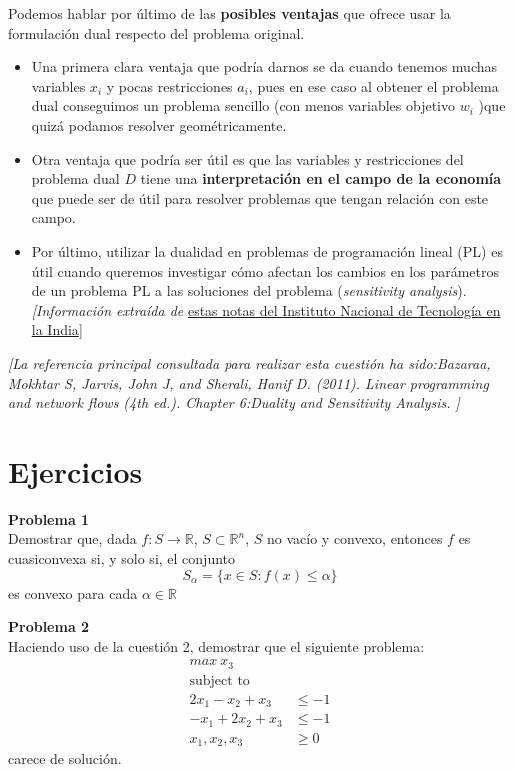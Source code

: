 \documentclass[a4paper]{article}
\newenvironment{problem}[2][Problema]
    { \begin{mdframed}[backgroundcolor=gray!20] \textbf{#1 #2} \\}
    {  \end{mdframed}}
\newcommand{\R}{\mathbb R}
\begin{document}
Podemos hablar por último de las \textbf{posibles ventajas} que ofrece usar la formulación dual respecto del problema original.

\begin{itemize}

\item Una primera clara ventaja que podría darnos se da cuando tenemos muchas variables \(x_i\) y pocas restricciones \(a_i\), pues en ese caso al obtener el problema dual conseguimos un problema sencillo (con menos variables objetivo \(w_i\) )que quizá podamos resolver geométricamente.

\item Otra ventaja que podría ser útil es que las variables y restricciones del problema dual \(D\) tiene una \textbf{interpretación en el campo de la economía} que puede ser de útil para resolver problemas que tengan relación con este campo.

\item Por último, utilizar la dualidad en problemas de programación lineal (PL) es útil cuando queremos investigar cómo afectan los cambios en los parámetros de un problema PL a las soluciones del problema (\emph{sensitivity analysis}).\\
\emph{[Información extraída de} \href{http://www.nitjsr.ac.in/course_assignment/CA02CA3103%20RMTLPP:%20Duality.pdf}{estas notas del Instituto Nacional de Tecnología en la India}]
\end{itemize}

\emph{[La referencia principal consultada para realizar esta cuestión ha sido:Bazaraa, Mokhtar S, Jarvis, John J, and Sherali, Hanif D. (2011). Linear programming and
network flows (4th ed.). Chapter 6:Duality and Sensitivity Analysis. ]}




\section{Ejercicios}

\begin{problem}{1}
Demostrar que, dada \(f:S\to \R\), \(S\subset \R^n\), \(S\) no vacío y convexo, entonces \(f\) es cuasiconvexa si, y solo si, el conjunto
\[
S_\alpha = \{x \in S: f(x) \leq \alpha\}
\]
es convexo para cada \(\alpha \in \R\)
\end{problem}


\begin{problem}{2}
Haciendo uso de la cuestión 2, demostrar que el siguiente problema:
\begin{align*}
  max\ x_3 &\\
 \text{subject to}\\
 2x_1 - x_2 + x_3 & \leq -1\\
 -x_1 + 2x_2 + x_3 & \leq -1\\
 x_1,x_2,x_3 & \geq 0
\end{align*}
carece de solución.
\end{problem}
\end{document}
